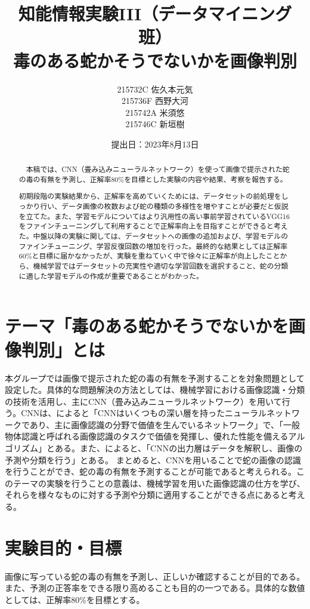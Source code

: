 \documentclass[a4paper, 11pt, titlepage]{jsarticle}
\title{知能情報実験III（データマイニング班）\\毒のある蛇かそうでないかを画像判別}
\author{215732C 佐久本元気\\215736F 西野大河\\215742A 米須悠\\215746C 新垣樹\\}
\date{提出日：2023年8月13日}
\begin{document}
\maketitle

\begin{abstract}
　本稿では、CNN（畳み込みニューラルネットワーク）を使って画像で提示された蛇の毒の有無を予測し、正解率80\%を目標とした実験の内容や結果、考察を報告する。\par
初期段階の実験結果から、正解率を高めていくためには、データセットの前処理をしっかり行い、データ画像の枚数および蛇の種類の多様性を増やすことが必要だと仮説を立てた。また、学習モデルについてはより汎用性の高い事前学習されているVGG16をファインチューニングして利用することで正解率向上を目指すことができると考えた。中盤以降の実験に関しては、データセットへの画像の追加および、学習モデルのファインチューニング、学習反復回数の増加を行った。最終的な結果としては正解率60\%と目標に届かなかったが、実験を重ねていく中で徐々に正解率が向上したことから、機械学習ではデータセットの充実性や適切な学習回数を選択すること、蛇の分類に適した学習モデルの作成が重要であることがわかった。
\end{abstract}

\tableofcontents

\section{テーマ「毒のある蛇かそうでないかを画像判別」とは}
本グループでは画像で提示された蛇の毒の有無を予測することを対象問題として設定した。具体的な問題解決の方法としては、機械学習における画像認識・分類の技術を活用し、主にCNN（畳み込みニューラルネットワーク）を用いて行う。CNNは、\cite{theme1}によると「CNNはいくつもの深い層を持ったニューラルネットワークであり、主に画像認識の分野で価値を生んでいるネットワーク」で、「一般物体認識と呼ばれる画像認識のタスクで価値を発揮し、優れた性能を備えるアルゴリズム」とある。また、\cite{theme2}によると、「CNNの出力層はデータを解釈し、画像の予測や分類を行う」とある。
まとめると、CNNを用いることで蛇の画像の認識を行うことができ、蛇の毒の有無を予測することが可能であると考えられる。このテーマの実験を行うことの意義は、機械学習を用いた画像認識の仕方を学び、それらを様々なものに対する予測や分類に適用することができる点にあると考える。

\section{実験目的・目標}
画像に写っている蛇の毒の有無を予測し、正しいか確認することが目的である。また、予測の正答率をできる限り高めることも目的の一つである。具体的な数値としては、正解率80\%を目標とする。
\end{document}
